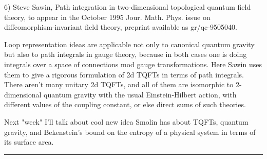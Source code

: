 6)  Steve Sawin, Path integration in two-dimensional topological quantum 
field theory, to appear in the October 1995 Jour. Math. Phys. issue on 
diffeomorphism-invariant field theory, preprint available as gr/qc-9505040.

Loop representation ideas are applicable not only to canonical quantum
gravity but also to path integrals in gauge theory, because in both cases
one is doing integrals over a space of connections mod gauge 
transformations.  Here Sawin uses them to give a rigorous formulation 
of 2d TQFTs in terms of path integrals.  There aren't many unitary 
2d TQFTs, and all of them are isomorphic to 2-dimensional quantum 
gravity with the usual Einstein-Hilbert action, with different values of the 
coupling constant, or else direct sums of such theories.    

Next "week" I'll talk about cool new idea Smolin has about TQFTs,
quantum gravity, and Bekenstein's bound on the entropy of a
physical system in terms of its surface area.
\par\noindent\rule{\textwidth}{0.4pt}

